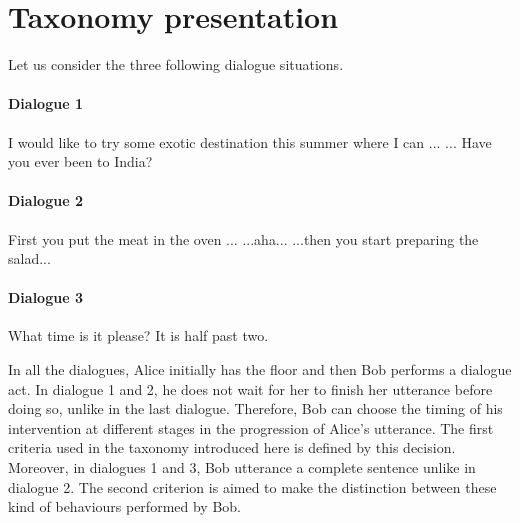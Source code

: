 \section{Taxonomy presentation}


        Let us consider the three following dialogue situations.

        \paragraph{Dialogue 1}

        \begin{dialogue}
           I would like to try some exotic destination this summer where I can ...
           ... Have you ever been to India?
        \end{dialogue}

        \paragraph{Dialogue 2}

        \begin{dialogue}
           First you put the meat in the oven ...
           ...aha...
           ...then you start preparing the salad...
        \end{dialogue}

        \paragraph{Dialogue 3}

        \begin{dialogue}
           What time is it please?
           It is half past two.
        \end{dialogue}

        In all the dialogues, Alice initially has the floor and then Bob performs a dialogue act. In dialogue 1 and 2, he does not wait for her to finish her utterance before doing so, unlike in the last dialogue. Therefore, Bob can choose the timing of his intervention at different stages in the progression of Alice's utterance. The first criteria used in the taxonomy introduced here is defined by this decision. Moreover, in dialogues 1 and 3, Bob utterance a complete sentence unlike in dialogue 2. The second criterion is aimed to make the distinction between these kind of behaviours performed by Bob.

